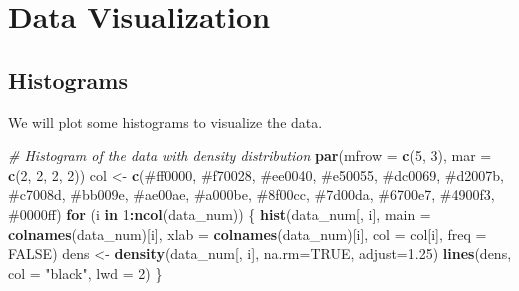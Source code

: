 \documentclass[
]{article}
\newenvironment{Shaded}{\begin{snugshade}}{\end{snugshade}}
\newcommand{\AttributeTok}[1]{\textcolor[rgb]{0.13,0.29,0.53}{#1}}
\newcommand{\CommentTok}[1]{\textcolor[rgb]{0.56,0.35,0.01}{\textit{#1}}}
\newcommand{\ConstantTok}[1]{\textcolor[rgb]{0.56,0.35,0.01}{#1}}
\newcommand{\ControlFlowTok}[1]{\textcolor[rgb]{0.13,0.29,0.53}{\textbf{#1}}}
\newcommand{\DecValTok}[1]{\textcolor[rgb]{0.00,0.00,0.81}{#1}}
\newcommand{\FloatTok}[1]{\textcolor[rgb]{0.00,0.00,0.81}{#1}}
\newcommand{\FunctionTok}[1]{\textcolor[rgb]{0.13,0.29,0.53}{\textbf{#1}}}
\newcommand{\NormalTok}[1]{#1}
\newcommand{\OtherTok}[1]{\textcolor[rgb]{0.56,0.35,0.01}{#1}}
\newcommand{\SpecialCharTok}[1]{\textcolor[rgb]{0.81,0.36,0.00}{\textbf{#1}}}
\newcommand{\StringTok}[1]{\textcolor[rgb]{0.31,0.60,0.02}{#1}}
\begin{document}
\section{Data Visualization}\label{data-visualization}

\subsection{Histograms}\label{histograms}

We will plot some histograms to visualize the data.

\begin{Shaded}
\begin{Highlighting}[]
\CommentTok{\# Histogram of the data with density distribution}
\FunctionTok{par}\NormalTok{(}\AttributeTok{mfrow =} \FunctionTok{c}\NormalTok{(}\DecValTok{5}\NormalTok{, }\DecValTok{3}\NormalTok{), }\AttributeTok{mar =} \FunctionTok{c}\NormalTok{(}\DecValTok{2}\NormalTok{, }\DecValTok{2}\NormalTok{, }\DecValTok{2}\NormalTok{, }\DecValTok{2}\NormalTok{))}
\NormalTok{col }\OtherTok{\textless{}{-}} \FunctionTok{c}\NormalTok{(}\StringTok{\textquotesingle{}\#ff0000\textquotesingle{}}\NormalTok{, }\StringTok{\textquotesingle{}\#f70028\textquotesingle{}}\NormalTok{, }\StringTok{\textquotesingle{}\#ee0040\textquotesingle{}}\NormalTok{, }\StringTok{\textquotesingle{}\#e50055\textquotesingle{}}\NormalTok{, }\StringTok{\textquotesingle{}\#dc0069\textquotesingle{}}\NormalTok{,}
         \StringTok{\textquotesingle{}\#d2007b\textquotesingle{}}\NormalTok{, }\StringTok{\textquotesingle{}\#c7008d\textquotesingle{}}\NormalTok{, }\StringTok{\textquotesingle{}\#bb009e\textquotesingle{}}\NormalTok{, }\StringTok{\textquotesingle{}\#ae00ae\textquotesingle{}}\NormalTok{, }\StringTok{\textquotesingle{}\#a000be\textquotesingle{}}\NormalTok{,}
         \StringTok{\textquotesingle{}\#8f00cc\textquotesingle{}}\NormalTok{, }\StringTok{\textquotesingle{}\#7d00da\textquotesingle{}}\NormalTok{, }\StringTok{\textquotesingle{}\#6700e7\textquotesingle{}}\NormalTok{, }\StringTok{\textquotesingle{}\#4900f3\textquotesingle{}}\NormalTok{, }\StringTok{\textquotesingle{}\#0000ff\textquotesingle{}}\NormalTok{)}
\ControlFlowTok{for}\NormalTok{ (i }\ControlFlowTok{in} \DecValTok{1}\SpecialCharTok{:}\FunctionTok{ncol}\NormalTok{(data\_num)) \{}
  \FunctionTok{hist}\NormalTok{(data\_num[, i], }\AttributeTok{main =} \FunctionTok{colnames}\NormalTok{(data\_num)[i],}
       \AttributeTok{xlab =} \FunctionTok{colnames}\NormalTok{(data\_num)[i], }\AttributeTok{col =}\NormalTok{ col[i], }\AttributeTok{freq =} \ConstantTok{FALSE}\NormalTok{)}
\NormalTok{  dens }\OtherTok{\textless{}{-}} \FunctionTok{density}\NormalTok{(data\_num[, i], }\AttributeTok{na.rm=}\ConstantTok{TRUE}\NormalTok{, }\AttributeTok{adjust=}\FloatTok{1.25}\NormalTok{)}
  \FunctionTok{lines}\NormalTok{(dens, }\AttributeTok{col =} \StringTok{"black"}\NormalTok{, }\AttributeTok{lwd =} \DecValTok{2}\NormalTok{)}
\NormalTok{\}}
\end{Highlighting}
\end{Shaded}
\end{document}
